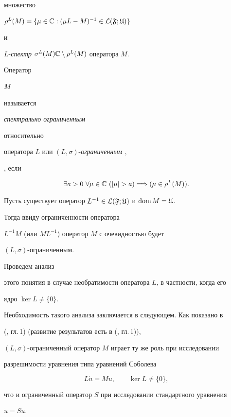 множество 


$\rho^L(M)=\{\mu\in\Bbb C:(\mu L-M)^{-1}\in\cal L(\frak F;\frak U)\}$


и 


$L$-{\it спектр} $\sigma^L(M)\Bbb C\setminus\rho^L(M)$ оператора $M$. 


Оператор 


$M$ 


называется {\it спектрально ограниченным 


относительно} оператора $L$ или $(L,\sigma)$-{\it ограниченным} \cite{S2}, 


\cite{S3}, если 


$$ 


\exists a>0 \ \forall\mu\in\Bbb C \ (|\mu|>a) \Longrightarrow 


(\mu\in\rho^L(M)). 


$$ 


 


Пусть существует оператор $L^{-1}\in\cal L(\frak F;\frak U)$ и $\operatorname{dom} M=\frak U$. 


Тогда ввиду ограниченности оператора 


$L^{-1}M$ (или $ML^{-1}$) оператор $M$ с очевидностью будет 


$(L,\sigma)$-ограниченным. 


Проведем анализ 


этого понятия в случае необратимости оператора $L$, в частности, когда его 


ядро $\ker L\ne\{0\}$. 


 


Необходимость такого анализа заключается в следующем. Как показано в 


(\cite{S4}, гл.\,1) (развитие результатов есть в (\cite{Bo}, гл.\,1)), 


$(L,\sigma)$-ограниченный оператор $M$ играет ту же роль при исследовании 


разрешимости уравнения типа уравнений Соболева \cite{S6} 


\begin{equation} 


L\Dot u=Mu,\qquad \ker L\ne \{0\},\tag{0.1} 


\end{equation} 


что и ограниченный оператор $S$ при исследовании стандартного уравнения 


$\Dot u=Su$. 


